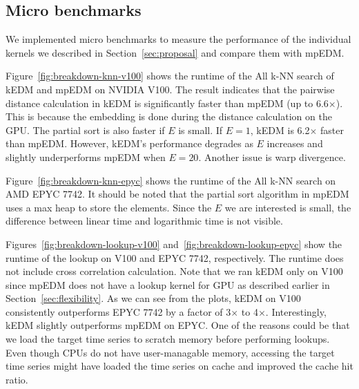\documentclass[sigconf]{acmart}
\begin{document}
\subsection{Micro benchmarks}

We implemented micro benchmarks to measure the performance of the individual
kernels we described in Section~\ref{sec:proposal} and compare them with
mpEDM\@.

Figure~\ref{fig:breakdown-knn-v100} shows the runtime of the All k-NN search
of kEDM and mpEDM on NVIDIA V100. The result indicates that the pairwise
distance calculation in kEDM is significantly faster than mpEDM (up to
6.6$\times$). This is because the embedding is done during the distance
calculation on the GPU\@. The partial sort is also faster if $E$ is small. If
$E=1$, kEDM is 6.2$\times$ faster than mpEDM\@. However, kEDM's performance
degrades as $E$ increases and slightly underperforms mpEDM when $E=20$.
Another issue is warp divergence.

Figure~\ref{fig:breakdown-knn-epyc} shows the runtime of the All k-NN search
on AMD EPYC 7742. It should be noted that the partial sort algorithm in mpEDM
uses a max heap to store the elements. Since the $E$ we are interested is
small, the difference between linear time and logarithmic time is not visible.


Figures~\ref{fig:breakdown-lookup-v100} and~\ref{fig:breakdown-lookup-epyc}
show the runtime of the lookup on V100 and EPYC 7742, respectively. The runtime
does not include cross correlation calculation. Note that we ran kEDM only on
V100 since mpEDM does not have a lookup kernel for GPU as described earlier in
Section~\ref{sec:flexibility}. As we can see from the plots, kEDM on V100
consistently outperforms EPYC 7742 by a factor of 3$\times$ to 4$\times$.
Interestingly, kEDM slightly outperforms mpEDM on EPYC. One of the reasons could
be that we load the target time series to scratch memory before performing
lookups. Even though CPUs do not have user-managable memory, accessing the
target time series might have loaded the time series on cache and improved the
cache hit ratio.
\end{document}

